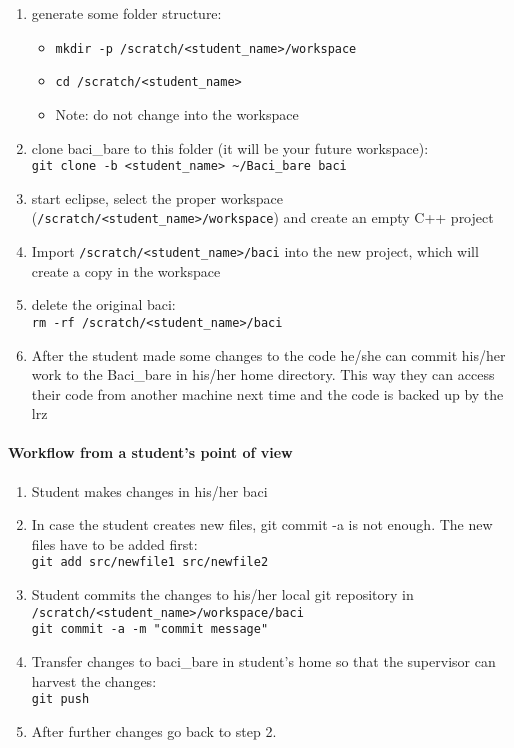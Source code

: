 \begin{enumerate}
  \item generate some folder structure:
\begin{itemize}
  \item \texttt{mkdir -p /scratch/<student\_name>/workspace}
  \item \texttt{cd /scratch/<student\_name>}
  \item Note: do not change into the workspace
\end{itemize}
  \item clone baci\_bare to this folder (it will be your future workspace): \\
  \texttt{git clone -b <student\_name> \~{}/Baci\_bare baci}
  \item start eclipse, select the proper workspace (\texttt{/scratch/<student\_name>/workspace}) and create an empty C++ project
  \item Import \texttt{/scratch/<student\_name>/baci} into the new project, which will create a copy in the workspace
  \item delete the original baci:\\
  \texttt{rm -rf /scratch/<student\_name>/baci}
  \item {After the student made some changes to the code he/she can commit his/her work to the \/Baci\_bare in his/her
home directory. This way they can access their code from another machine next time and the code is backed up by the lrz }	
\end{enumerate}

\paragraph{Workflow from a student's point of view}
\begin{enumerate}
  \item Student makes changes in his/her baci
  \item In case the student creates new files, git commit -a is not enough. The new files have to be added first:\\
  \texttt{git add src/newfile1 src/newfile2}
  \item Student commits the changes to his/her local git repository in \texttt{/scratch/<student\_name>/workspace/baci}\\
  \texttt{git commit -a -m "commit message"}
  \item Transfer changes to baci\_bare in student's home so that the supervisor can harvest the changes:\\
  \texttt{git push}
  \item After further changes go back to step 2.
\end{enumerate}


